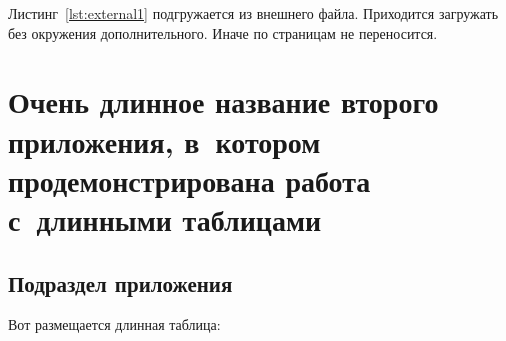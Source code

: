 Листинг~\cref{lst:external1} подгружается из внешнего файла. Приходится
загружать без окружения дополнительного. Иначе по страницам не переносится.
\begingroup
\captiondelim{ } %

\endgroup

\chapter{Очень длинное название второго приложения, в~котором продемонстрирована работа с~длинными таблицами}\label{app:B}

\section{Подраздел приложения}\label{app:B1}
Вот размещается длинная таблица:
\makeatletter
{} %
{%
\renewenvironment{longtable*}
  {\renewcommand\LTcaptype{}\longtable}
  {\endlongtable}
}
{
    {\addtocounter{table}{-1}}
    {}
}
\makeatother
\fontsize{10pt}{10pt}\selectfont

